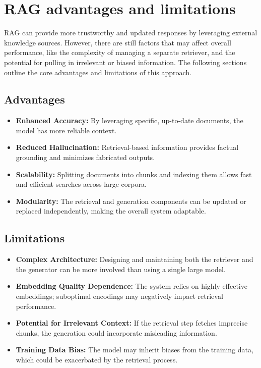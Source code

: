 \documentclass[conference]{IEEEtran}
\begin{document}
\section{RAG advantages and limitations}
RAG can provide more trustworthy and updated responses by leveraging external knowledge sources.
However, there are still factors that may affect overall performance, like the complexity of managing a separate retriever,
and the potential for pulling in irrelevant or biased information.
The following sections outline the core advantages and limitations of this approach.

\subsection{Advantages}
\begin{itemize}
    \item \textbf{Enhanced Accuracy:} By leveraging specific, up-to-date documents, the model has more reliable context.
    \item \textbf{Reduced Hallucination:} Retrieval-based information provides
          factual grounding and minimizes fabricated outputs.
    \item \textbf{Scalability:} Splitting documents into chunks and indexing them allows fast and efficient searches across large corpora.
    \item \textbf{Modularity:} The retrieval and generation components can be updated or replaced independently, making the overall system adaptable.
\end{itemize}

\subsection{Limitations}
\begin{itemize}
    \item \textbf{Complex Architecture:} Designing and maintaining both the retriever and the generator can be more involved than using a single large model.
    \item \textbf{Embedding Quality Dependence:} The system relies on highly effective embeddings; suboptimal encodings may negatively impact retrieval performance.
    \item \textbf{Potential for Irrelevant Context:} If the retrieval step fetches imprecise chunks, the generation could incorporate misleading information.
    \item \textbf{Training Data Bias:} The model may inherit biases from the training data, which could be exacerbated by the retrieval process.
\end{itemize}
\end{document}
